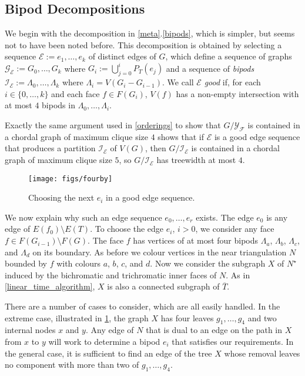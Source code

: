 \documentclass{patmorin}
\begin{document}
\subsection{Bipod Decompositions}

We begin with the decomposition in \cref{meta}.\ref{bipods}, which is simpler, but seems not to have been noted before.  This decomposition is obtained by selecting a sequence $\mathcal{E}:=e_1,\ldots,e_k$ of distinct edges of $G$, which define a sequence of graphs $\mathcal{G_E}:=G_{0},\ldots,G_k$ where $G_i:=\bigcup_{j=0}^i P_T(e_j)$ and a sequence of \emph{bipods} $\mathcal{I_E}:=\Lambda_0,\ldots,\Lambda_k$ where $\Lambda_i=V(G_i-G_{i-1})$.  We call $\mathcal{E}$ \emph{good} if, for each $i\in\{0,\ldots,k\}$ and each face $f\in F(G_i)$, $V(f)$ has a non-empty intersection with at most $4$ bipods in $\Lambda_0,\ldots,\Lambda_i$.

Exactly the same argument used in \cref{orderings} to show that $G/\mathcal{Y_F}$ is contained in a chordal graph of maximum clique size $4$ shows that if $\mathcal{E}$ is a good edge sequence that produces a partition $\mathcal{I_E}$ of $V(G)$, then $G/\mathcal{I_E}$ is contained in a chordal graph of maximum clique size $5$, so $G/\mathcal{I_E}$ has treewidth at most $4$.

\begin{figure}
  \begin{center}
      \texttt{[image: figs/fourby]}
  \end{center}
  \caption{Choosing the next $e_i$ in a  good edge sequence.}
  \label{e_i}
\end{figure}

We now explain why such an edge sequence $e_0,\ldots,e_r$ exists.  The edge $e_0$ is any edge of $E(f_0)\setminus E(T)$.  To choose the edge $e_i$, $i>0$, we consider any face $f\in F(G_{i-1})\setminus F(G)$.  The face $f$ has vertices of at most four bipods $\Lambda_a$, $\Lambda_b$, $\Lambda_c$, and $\Lambda_{d}$ on its boundary.  As before we colour vertices in the near triangulation $N$ bounded by $f$ with colours $a$, $b$, $c$, and $d$. Now we consider the subgraph $X$ of $N^\star$ induced by the bichromatic and trichromatic inner faces of $N$.  As in \cref{linear_time_algorithm}, $X$ is also a connected subgraph of $\overline{T}$.

There are a number of cases to consider, which are all easily handled.  In the extreme case, illustrated in \cref{e_i}, the graph $X$ has four leaves $g_1,\ldots,g_4$ and two internal nodes $x$ and $y$.  Any edge of $N$ that is dual to an edge on the path in $X$ from $x$ to $y$ will work to determine a bipod $e_i$ that satisfies our requirements.  In the general case, it is sufficient to find an edge of the tree $X$ whose removal leaves no component with more than two of $g_1,\ldots,g_4$.
\end{document}
